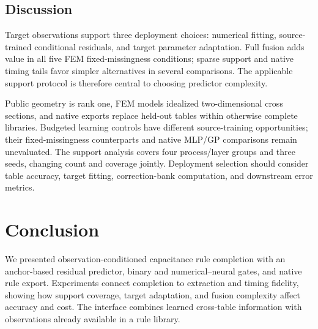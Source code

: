 \documentclass[conference,10pt,letterpaper]{IEEEtran}
\begin{document}
\subsection{Discussion}
Target observations support three deployment choices: numerical fitting, source-trained conditional residuals, and target parameter adaptation. Full fusion adds value in all five FEM fixed-missingness conditions; sparse support and native timing tails favor simpler alternatives in several comparisons. The applicable support protocol is therefore central to choosing predictor complexity.

Public geometry is rank one, FEM models idealized two-dimensional cross sections, and native exports replace held-out tables within otherwise complete libraries. Budgeted learning controls have different source-training opportunities; their fixed-missingness counterparts and native MLP/GP comparisons remain unevaluated. The support analysis covers four process/layer groups and three seeds, changing count and coverage jointly. Deployment selection should consider table accuracy, target fitting, correction-bank computation, and downstream error metrics.

\section{Conclusion}
We presented observation-conditioned capacitance rule completion with an anchor-based residual predictor, binary and numerical--neural gates, and native rule export. Experiments connect completion to extraction and timing fidelity, showing how support coverage, target adaptation, and fusion complexity affect accuracy and cost. The interface combines learned cross-table information with observations already available in a rule library.

\clearpage


\end{document}
